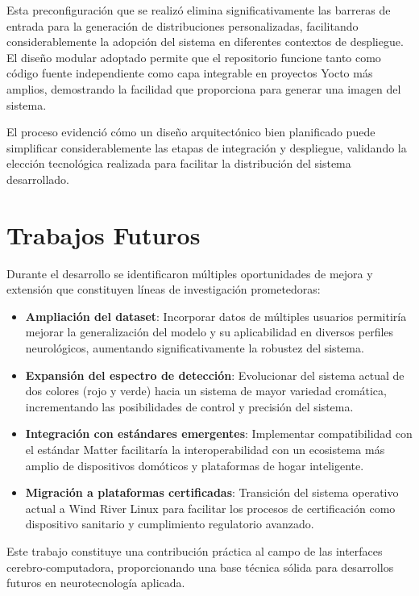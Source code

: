 Esta preconfiguración que se realizó elimina significativamente las barreras de entrada para la generación de distribuciones personalizadas, facilitando considerablemente la adopción del sistema en diferentes contextos de despliegue. El diseño modular adoptado permite que el repositorio funcione tanto como código fuente independiente como capa integrable en proyectos Yocto más amplios, demostrando la facilidad que proporciona para generar una imagen del sistema.

El proceso evidenció cómo un diseño arquitectónico bien planificado puede simplificar considerablemente las etapas de integración y despliegue, validando la elección tecnológica realizada para facilitar la distribución del sistema desarrollado.

\section{Trabajos Futuros}

Durante el desarrollo se identificaron múltiples oportunidades de mejora y extensión que constituyen líneas de investigación prometedoras:

\begin{itemize}
    \item \textbf{Ampliación del dataset}: Incorporar datos de múltiples usuarios permitiría mejorar la generalización del modelo y su aplicabilidad en diversos perfiles neurológicos, aumentando significativamente la robustez del sistema.
    
    \item \textbf{Expansión del espectro de detección}: Evolucionar del sistema actual de dos colores (rojo y verde) hacia un sistema de mayor variedad cromática, incrementando las posibilidades de control y precisión del sistema.
    
    \item \textbf{Integración con estándares emergentes}: Implementar compatibilidad con el estándar Matter facilitaría la interoperabilidad con un ecosistema más amplio de dispositivos domóticos y plataformas de hogar inteligente.
    
    \item \textbf{Migración a plataformas certificadas}: Transición del sistema operativo actual a Wind River Linux para facilitar los procesos de certificación como dispositivo sanitario y cumplimiento regulatorio avanzado.
\end{itemize}

Este trabajo constituye una contribución práctica al campo de las interfaces cerebro-computadora, proporcionando una base técnica sólida para desarrollos futuros en neurotecnología aplicada.
